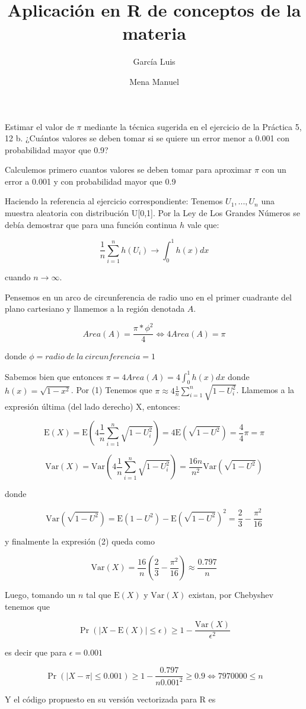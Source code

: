 \documentclass{article}
\title{Aplicación en R de conceptos de la materia}
\author{García Luis \and Mena Manuel}
\begin{document}
\maketitle

Estimar el valor de $\pi$ mediante la técnica sugerida en el ejercicio de la Práctica 5, 12 b.
¿Cuántos valores se deben tomar si se quiere un error menor a 0.001 con probabilidad mayor que 0.9?

Calculemos primero cuantos valores se deben tomar para aproximar $\pi$ con un error a 0.001 y con probabilidad mayor que 0.9

Haciendo la referencia al ejercicio correspondiente: Tenemos $U_1, ..., U_n$ una muestra aleatoria con distribución U[0,1].
Por la Ley de Los Grandes Números se debía demostrar que para una función continua $h$ vale que:

\begin{equation}
	\frac{1}{n}\sum_{i=1}^{n}{h(U_i)} \longrightarrow \int_0^1{h(x) dx}
\end{equation}

cuando $n \to \infty$.

Pensemos en un arco de circunferencia de radio uno en el primer cuadrante del plano cartesiano y llamemos a la región denotada $A$.

\[
	Area(A) = \frac{\pi * \phi^2}{4} \iff 4 Area(A) = \pi
\]

donde $\phi = radio\ de\ la\ circunferencia = 1$

Sabemos bien que entonces $\pi = 4 Area(A) = 4 \int_0^1{h(x) dx}$ donde $h(x) = \sqrt{1-x^2}$. Por (1) Tenemos que $\pi \approx 4\frac{1}{n}\sum_{i=1}^{n}{\sqrt{1-U_i^2}}$. Llamemos a la expresión última (del lado derecho) X, entonces:

\[
	\mathrm{E}(X) = \mathrm{E}(4\frac{1}{n}\sum_{i=1}^{n}{\sqrt{1-U_i^2}}) = 4 \mathrm{E}(\sqrt{1-U^2}) = \frac{4}{4} \pi = \pi
\]

\begin{equation}
	\mathrm{Var}(X) = \mathrm{Var}(4\frac{1}{n}\sum_{i=1}^{n}{\sqrt{1-U_i^2}}) = \frac{16n}{n^2} \mathrm{Var}(\sqrt{1-U^2})
\end{equation}

donde

\[ \mathrm{Var}(\sqrt{1-U^2}) = \mathrm{E}(1-U^2) - \mathrm{E}(\sqrt{1-U^2})^2 = \frac{2}{3} - \frac{\pi^2}{16} \]

y finalmente la expresión (2) queda como

\[
	\mathrm{Var}(X) = \frac{16}{n} ( \frac{2}{3} - \frac{\pi^2}{16} ) \approx \frac{0.797}{n}
\]

Luego, tomando un $n$ tal que $\mathrm{E}(X)$ y $\mathrm{Var}(X)$ existan, por Chebyshev tenemos que

\[
	\Pr( |X - \mathrm{E}(X)| \leq \epsilon ) \geq 1 - \frac{\mathrm{Var}(X)}{\epsilon^2}
\]

es decir que para $\epsilon = 0.001$

\[
	\Pr( |X - \pi| \leq 0.001 ) \geq 1 - \frac{0.797}{n 0.001^2} \geq 0.9 \iff 7970000 \leq n
\]

Y el código propuesto en su versión vectorizada para R es


\end{document}

